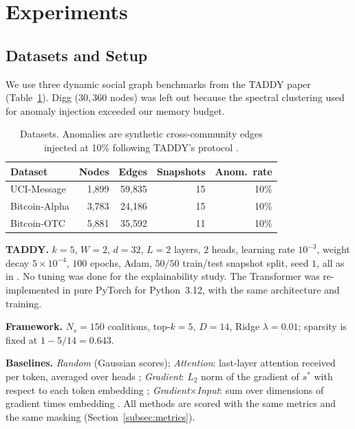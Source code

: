 \documentclass[conference]{IEEEtran}
\begin{document}
\section{Experiments}
\label{sec:experiments}

\subsection{Datasets and Setup}
We use three dynamic social graph benchmarks from the TADDY paper
\cite{liu2021taddy} (Table~\ref{tab:datasets}). Digg ($30{,}360$ nodes) was
left out because the spectral clustering used for anomaly injection exceeded
our memory budget.

\begin{table}[!t]
\centering
\caption{Datasets. Anomalies are synthetic cross-community edges injected at
10\% following TADDY's protocol \cite{liu2021taddy}.}
\label{tab:datasets}
\footnotesize
\setlength{\tabcolsep}{5pt}
\begin{tabular}{lrrrr}
\toprule
\textbf{Dataset} & \textbf{Nodes} & \textbf{Edges} &
\textbf{Snapshots} & \textbf{Anom.\ rate} \\
\midrule
UCI-Message   & 1{,}899 & 59{,}835 & 15 & 10\% \\
Bitcoin-Alpha & 3{,}783 & 24{,}186 & 15 & 10\% \\
Bitcoin-OTC   & 5{,}881 & 35{,}592 & 11 & 10\% \\
\bottomrule
\end{tabular}
\end{table}

\noindent\textbf{TADDY.} $k{=}5$, $W{=}2$, $d{=}32$, $L{=}2$ layers, $2$
heads, learning rate $10^{-3}$, weight decay $5{\times}10^{-4}$, $100$ epochs,
Adam, $50/50$ train/test snapshot split, seed $1$, all as in
\cite{liu2021taddy}. No tuning was done for the explainability study. The
Transformer was re-implemented in pure PyTorch for Python~3.12, with the same
architecture and training.

\noindent\textbf{Framework.} $N_s{=}150$ coalitions, top-$k{=}5$, $D{=}14$,
Ridge $\lambda{=}0.01$; sparsity is fixed at $1-5/14=0.643$.

\noindent\textbf{Baselines.} \emph{Random} (Gaussian scores);
\emph{Attention}: last-layer attention received per token, averaged over heads
\cite{jain2019attention}; \emph{Gradient}: $L_2$ norm of the gradient of $s^*$
with respect to each token embedding \cite{simonyan2014saliency};
\emph{Gradient$\times$Input}: sum over dimensions of gradient times embedding
\cite{shrikumar2017deeplift}. All methods are scored with the same metrics and
the same masking (Section~\ref{subsec:metrics}).
\end{document}
